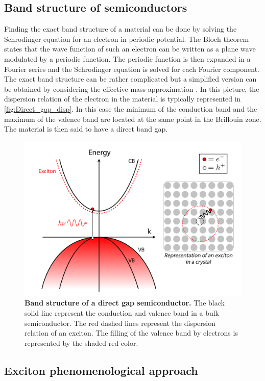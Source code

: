 \subsection{Band structure of semiconductors}

Finding the exact band structure of a material can be done by solving the Schrodinger equation for an electron in periodic potential.
 The Bloch theorem states that the wave function of such an electron can be written as a plane wave modulated by a periodic function. The periodic function is then expanded in a Fourier series and the Schrodinger equation is solved for each Fourier component. 
 The exact band structure can be rather complicated but a simplified version can be obtained by considering the effective mass approximation \cite{kittel_introduction_2005}. In this picture, the dispersion relation of the electron in the material is typically represented in \autoref{fig:Direct_gap_disp}.
In this case the minimum of the conduction band and the maximum of the valence band are located at the same point in the Brillouin zone. The material is then said to have a direct band gap.
\begin{figure}[h]
    \centering
    \includegraphics[width=0.8\linewidth]{chap_theory/fig/DirectGapDisp.png}
    \caption{\textbf{Band structure of a direct gap semiconductor.} The black solid line represent the conduction and valence band in a bulk semiconductor. The red dashed lines represent the dispersion relation of an exciton. The filling of the valence band by electrons is represented by the shaded red color.}
    \label{fig:Direct_gap_disp}
\end{figure}


\subsection{Exciton phenomenological approach}

